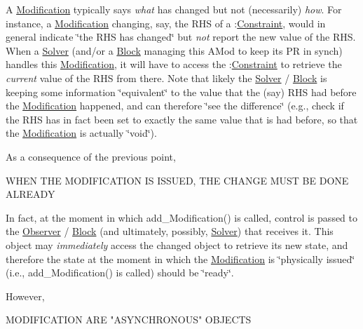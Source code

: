 \begin{DoxyEnumerate}
\item A \mbox{\hyperlink{class_s_m_spp__di__unipi__it_1_1_modification}{Modification}} typically says {\itshape what} has changed but not (necessarily) {\itshape how}. For instance, a \mbox{\hyperlink{class_s_m_spp__di__unipi__it_1_1_modification}{Modification}} changing, say, the R\+HS of a \+:\mbox{\hyperlink{class_s_m_spp__di__unipi__it_1_1_constraint}{Constraint}}, would in general indicate \char`\"{}the R\+H\+S has changed\char`\"{} but {\itshape not} report the new value of the R\+HS. When a \mbox{\hyperlink{class_s_m_spp__di__unipi__it_1_1_solver}{Solver}} (and/or a \mbox{\hyperlink{class_s_m_spp__di__unipi__it_1_1_block}{Block}} managing this A\+Mod to keep its PR in synch) handles this \mbox{\hyperlink{class_s_m_spp__di__unipi__it_1_1_modification}{Modification}}, it will have to access the \+:\mbox{\hyperlink{class_s_m_spp__di__unipi__it_1_1_constraint}{Constraint}} to retrieve the {\itshape current} value of the R\+HS from there. Note that likely the \mbox{\hyperlink{class_s_m_spp__di__unipi__it_1_1_solver}{Solver}} / \mbox{\hyperlink{class_s_m_spp__di__unipi__it_1_1_block}{Block}} is keeping some information \char`\"{}equivalent\char`\"{} to the value that the (say) R\+HS had before the \mbox{\hyperlink{class_s_m_spp__di__unipi__it_1_1_modification}{Modification}} happened, and can therefore \char`\"{}see the difference\char`\"{} (e.\+g., check if the R\+HS has in fact been set to exactly the same value that is had before, so that the \mbox{\hyperlink{class_s_m_spp__di__unipi__it_1_1_modification}{Modification}} is actually \char`\"{}void\char`\"{}).
\item As a consequence of the previous point,

W\+H\+EN T\+HE M\+O\+D\+I\+F\+I\+C\+A\+T\+I\+ON IS I\+S\+S\+U\+ED, T\+HE C\+H\+A\+N\+GE M\+U\+ST BE D\+O\+NE A\+L\+R\+E\+A\+DY

In fact, at the moment in which add\+\_\+\+Modification() is called, control is passed to the \mbox{\hyperlink{class_s_m_spp__di__unipi__it_1_1_observer}{Observer}} / \mbox{\hyperlink{class_s_m_spp__di__unipi__it_1_1_block}{Block}} (and ultimately, possibly, \mbox{\hyperlink{class_s_m_spp__di__unipi__it_1_1_solver}{Solver}}) that receives it. This object may {\itshape immediately} access the changed object to retrieve its new state, and therefore the state at the moment in which the \mbox{\hyperlink{class_s_m_spp__di__unipi__it_1_1_modification}{Modification}} is \char`\"{}physically issued\char`\"{} (i.\+e., add\+\_\+\+Modification() is called) should be \char`\"{}ready\char`\"{}.
\item However, \begin{DoxyVerb}MODIFICATION ARE "ASYNCHRONOUS" OBJECTS
\end{DoxyVerb}



\end{DoxyEnumerate}
